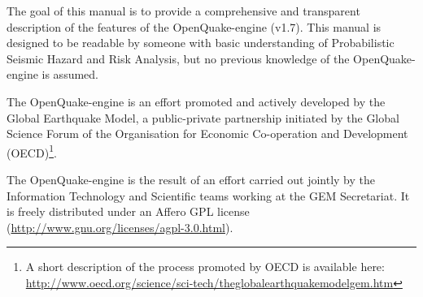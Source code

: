 The goal of this manual is to provide a comprehensive and transparent
description of the features of the OpenQuake-engine (v1.7). This manual is
designed to be readable by someone with basic understanding of Probabilistic
Seismic Hazard and Risk Analysis, but no previous knowledge of the OpenQuake-
engine is assumed.

The OpenQuake-engine is an effort promoted and actively developed by the
Global Earthquake Model, a public-private partnership initiated by the
Global Science Forum of the Organisation for Economic Co-operation and Development
(OECD)\footnote{A short description of the process promoted by OECD is available here:\\\href{http://www.oecd.org/science/sci-tech/theglobalearthquakemodelgem.htm}{http://www.oecd.org/science/sci-tech/theglobalearthquakemodelgem.htm}}.

The OpenQuake-engine is the result of an effort carried out jointly by the
Information Technology and Scientific teams working at the GEM Secretariat.
It is freely distributed under an Affero GPL license
(\href{http://www.gnu.org/licenses/agpl-3.0.html}{http://www.gnu.org/licenses/agpl-3.0.html}).
